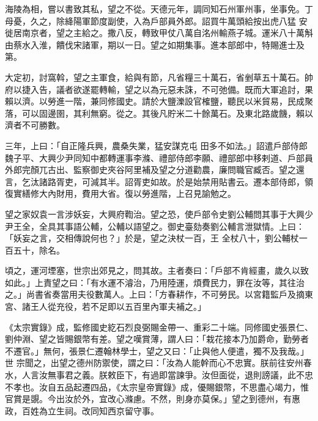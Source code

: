 \begin{pinyinscope}
 海陵為相，嘗以書致其私，望之不從。天德元年，調同知石州軍州事，坐事免。丁母憂，久之，除絳陽軍節度副使，入為戶部員外郎。詔買牛萬頭給按出虎八猛
 安徙居南京者，望之主給之。撒八反，轉致甲仗八萬自洺州輸燕子城。運米八十萬斛由蔡水入淮，饋伐宋諸軍，期以一日。望之如期集事。進本部郎中，特賜進士及第。



 大定初，討窩斡，望之主軍食，給與有節，凡省糧三十萬石，省剉草五十萬石。帥府以捷入告，議者欲遂罷轉輸，望之以為元惡未誅，不可弛備。既而大軍追討，果賴以濟。以勞進一階，兼同修國史。請於大鹽濼設官榷鹽，聽民以米貿易，民成聚落，可以固邊圉，其利無窮。從之。其後凡貯米二十餘萬石。及東北路歲饑，賴以濟者不可勝數。



 三年，上曰：「自正隆兵興，農桑失業，猛安謀克屯
 田多不如法。」詔遣戶部侍郎魏子平、大興少尹同知中都轉運事李滌、禮部侍郎李願、禮部郎中移剌道、戶部員外郎完顏兀古出、監察御史夾谷阿里補及望之分道勸農，廉問職官臧否。望之還言，乞汰諸路胥吏，可減其半。詔胥吏如故。於是始禁用貼書云。遷本部侍郎，領復實繕修大內財用，費用大省。復以勞進階，上召見諭勉之。



 望之家奴袁一言涉妖妄，大興府鞫治。望之恐，使戶部令史劉公輔問其事于大興少尹王全，全具其事語公輔，公輔以語望之。御史臺劾奏劉公輔言泄獄情。上曰：「妖妄之言，交相傳說何也？」於是，望之決杖一百，王
 全杖八十，劉公輔杖一百五十，除名。



 頃之，運河堙塞，世宗出郊見之，問其故。主者奏曰：「戶部不肯經畫，歲久以致如此。」上責望之曰：「有水運不濬治，乃用陸運，煩費民力，罪在汝等，其往治之。」尚書省奏當用夫役數萬人。上曰：「方春耕作，不可勞民。以宮籍監戶及摘東宮、諸王人從充役，若不足即以五百里內軍夫補之。」



 《太宗實錄》成，監修國史紇石烈良弼賜金帶一、重彩二十端。同修國史張景仁、劉仲淵、望之皆賜銀幣有差。望之嘆賞薄，謂人曰：「栽花接本乃加爵命，勤勞者不遷官。」無何，張景仁遷翰林學士，望之又曰：「止與他人便遣，獨不及我哉。」世
 宗聞之，出望之德州防禦使，謂之曰：「汝為人能幹而心不忠實。朕前往安州春水，人言汝無事君之義。朕敕臣下，有過即當諫爭。汝但面從，退則謗議，此不忠不孝也。汝自五品起遷四品，《太宗皇帝實錄》成，優賜銀幣，不思盡心竭力，惟官賞是覬。今出汝於外，宜改心滌慮。不然，則身亦莫保。」望之到德州，有惠政，百姓為立生祠。改同知西京留守事。




\end{pinyinscope}
